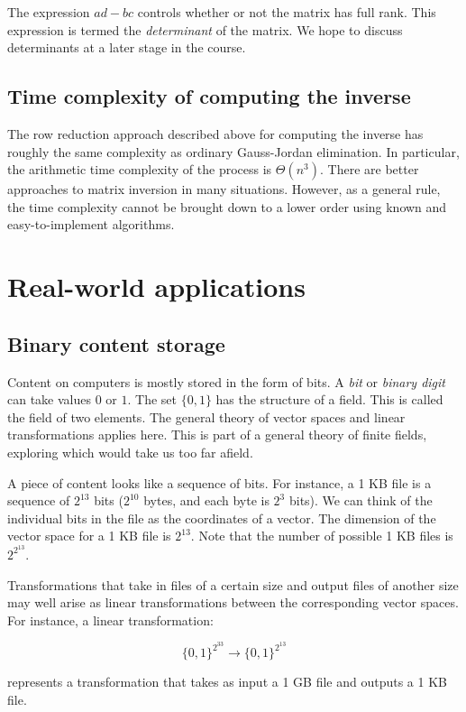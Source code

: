 \documentclass[10pt]{amsart}
\begin{document}
The expression $ad - bc$ controls whether or not the matrix has full
rank. This expression is termed the {\em determinant} of the
matrix. We hope to discuss determinants at a later stage in the
course.

\subsection{Time complexity of computing the inverse}

The row reduction approach described above for computing the inverse
has roughly the same complexity as ordinary Gauss-Jordan
elimination. In particular, the arithmetic time complexity of the
process is $\Theta(n^3)$. There are better approaches to matrix
inversion in many situations. However, as a general rule, the time
complexity cannot be brought down to a lower order using known and
easy-to-implement algorithms.
\section{Real-world applications}

\subsection{Binary content storage}

Content on computers is mostly stored in the form of bits. A {\em bit}
or {\em binary digit} can take values $0$ or $1$. The set $\{ 0, 1 \}$
has the structure of a field. This is called the field of two
elements. The general theory of vector spaces and linear
transformations applies here. This is part of a general theory of
finite fields, exploring which would take us too far afield.

A piece of content looks like a sequence of bits. For instance, a 1 KB
file is a sequence of $2^{13}$ bits ($2^{10}$ bytes, and each byte is
$2^3$ bits). We can think of the individual bits in the file as the
coordinates of a vector. The dimension of the vector space for a 1 KB
file is $2^{13}$. Note that the number of possible 1 KB files is
$2^{2^{13}}$.

Transformations that take in files of a certain size and output files
of another size may well arise as linear transformations between the
corresponding vector spaces. For instance, a linear transformation:

$$\{ 0,1 \}^{2^{33}} \to \{ 0,1 \}^{2^{13}}$$

represents a transformation that takes as input a 1 GB file and
outputs a 1 KB file.
\end{document}

